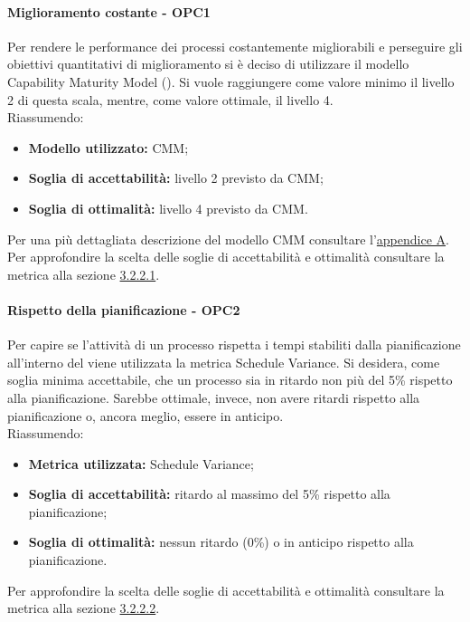 \documentclass[PianoDiQualifica.tex]{subfiles}
\begin{document}
			\paragraph{Miglioramento costante - OPC1}
			Per rendere le performance dei processi costantemente migliorabili e perseguire gli obiettivi quantitativi di miglioramento si è deciso di utilizzare il modello Capability Maturity Model ().
			Si vuole raggiungere come valore minimo il livello 2 di questa scala, mentre, come valore ottimale, il livello 4. \\
			Riassumendo:
			\begin{itemize}
			\item \textbf{Modello utilizzato:} CMM;
			\item \textbf{Soglia di accettabilità:} livello 2 previsto da CMM;
			\item \textbf{Soglia di ottimalità:} livello 4 previsto da CMM.
			\end{itemize}
			Per una più dettagliata descrizione del modello CMM consultare l'\hyperlink{CMM_label}{appendice A}. \\
			Per approfondire la scelta delle soglie di accettabilità e ottimalità consultare la metrica alla sezione \hyperlink{CMM_m}{3.2.2.1}.

			\paragraph{Rispetto della pianificazione - OPC2}
			Per capire se l'attività di un processo rispetta i tempi stabiliti dalla pianificazione all'interno del \PPdoc{} viene utilizzata la metrica Schedule Variance.
			Si desidera, come soglia minima accettabile, che un processo sia in ritardo non più del 5\% rispetto alla pianificazione. Sarebbe ottimale, invece, non avere ritardi
			rispetto alla pianificazione o, ancora meglio, essere in anticipo.\\
			Riassumendo:
			\begin{itemize}
			\item \textbf{Metrica utilizzata:} Schedule Variance;
			\item \textbf{Soglia di accettabilità:} ritardo al massimo del 5\% rispetto alla pianificazione;
			\item \textbf{Soglia di ottimalità:} nessun ritardo (0\%) o in anticipo rispetto alla pianificazione.
			\end{itemize}
			Per approfondire la scelta delle soglie di accettabilità e ottimalità consultare la metrica alla sezione \hyperlink{Schedule_m}{3.2.2.2}.
\end{document}
